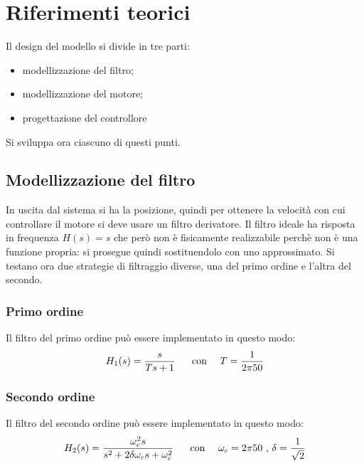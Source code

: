 \documentclass[a4paper,11pt, Arial]{article}
\begin{document}
\section{Riferimenti teorici}
Il design del modello si divide in tre parti:
\begin{itemize}
  \item modellizzazione del filtro; 
  \item modellizzazione del motore;
  \item progettazione del controllore
\end{itemize}
Si sviluppa ora ciascuno di questi punti.

\subsection{Modellizzazione del filtro}
In uscita dal sistema si ha la posizione, quindi per ottenere la velocità con cui controllare il motore si deve usare un filtro derivatore. Il filtro ideale ha risposta in frequenza $H(s)=s$ che però non è fisicamente realizzabile perchè non è una funzione propria: si prosegue quindi sostituendolo con uno approssimato. 
Si testano ora due strategie di filtraggio diverse, una del primo ordine e l'altra del secondo.

 \subsubsection{Primo ordine}
 Il filtro del primo ordine può essere implementato in questo modo: 
 \begin{equation}
 H_1(s)=\frac{s}{T s+1}  \text{ \hspace{10 pt} con \hspace{10 pt}} T=\frac{1}{2 \pi 50}
 \end{equation}
 
  \subsubsection{Secondo ordine}
 Il filtro del secondo ordine può essere implementato in questo modo: 
 \begin{equation}
 H_2(s)=\frac{\omega_c^2 s}{s^2 + 2\delta \omega_c s+\omega_c^2}  \text{ \hspace{10 pt} con \hspace{10 pt}} \omega_c=2 \pi 50 \text{ , } \delta=\frac{1}{\sqrt{2}}
 \end{equation}
 
\end{document}
